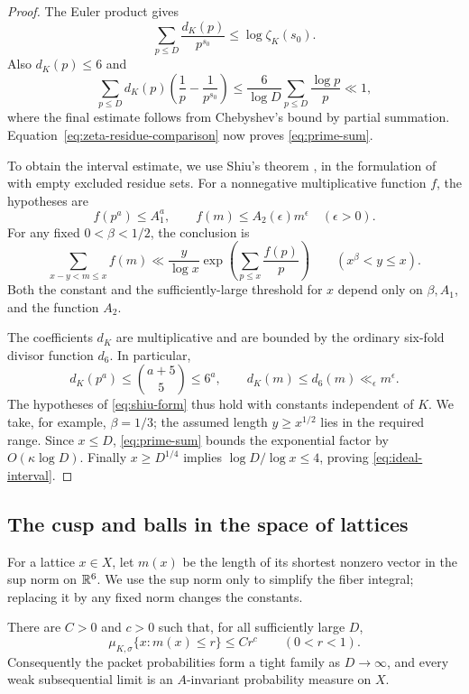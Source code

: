 \begin{proof}
The Euler product gives
\[
 \sum_{p\le D}\frac{d_K(p)}{p^{s_0}}
      \le\log\zeta_K(s_0).
\]
Also $d_K(p)\le6$ and
\[
 \sum_{p\le D}d_K(p)\left(\frac1p-\frac1{p^{s_0}}\right)
 \le\frac6{\log D}\sum_{p\le D}\frac{\log p}{p}\ll1,
\]
where the final estimate follows from Chebyshev's bound by partial
summation.  Equation~\eqref{eq:zeta-residue-comparison} now proves
\eqref{eq:prime-sum}.

To obtain the interval estimate, we use Shiu's theorem
\cite{Shiu1980}, in the formulation of
\cite[Theorem~1.1]{Pollack2020} with empty excluded residue sets.
For a nonnegative multiplicative function $f$, the hypotheses are
\[
 f(p^a)\le A_1^a,
 \qquad
 f(m)\le A_2(\epsilon)m^\epsilon
       \quad(\epsilon>0).
\]
For any fixed $0<\beta<1/2$, the conclusion is
\begin{equation}
 \sum_{x-y<m\le x}f(m)
 \ll\frac y{\log x}
     \exp\left(\sum_{p\le x}\frac{f(p)}p\right)
 \qquad(x^\beta<y\le x).                         \label{eq:shiu-form}
\end{equation}
Both the constant and the sufficiently-large threshold for $x$
depend only on $\beta,A_1$, and the function $A_2$.

The coefficients $d_K$ are multiplicative and are bounded by the
ordinary six-fold divisor function $d_6$.  In particular,
\[
 d_K(p^a)\le\binom{a+5}{5}\le6^a,
 \qquad d_K(m)\le d_6(m)\ll_\epsilon m^\epsilon.
\]
The hypotheses of \eqref{eq:shiu-form} thus hold with constants
independent of $K$.  We take, for example, $\beta=1/3$; the assumed
length $y\ge x^{1/2}$ lies in the required range.  Since $x\le D$,
\eqref{eq:prime-sum} bounds the exponential factor by
$O(\kappa\log D)$.  Finally $x\ge D^{1/4}$ implies
$\log D/\log x\le4$, proving \eqref{eq:ideal-interval}.
\end{proof}

\subsection{The cusp and balls in the space of lattices}

For a lattice $x\in X$, let $m(x)$ be the length of its shortest
nonzero vector in the sup norm on $\mathbb R^6$.  We use the sup norm only
to simplify the fiber integral; replacing it by any fixed norm
changes the constants.

\begin{proposition}\label{prop:cusp}
There are $C>0$ and $c>0$ such that, for all sufficiently large $D$,
\[
 \mu_{K,\sigma}\{x:m(x)\le r\}\le Cr^c
       \qquad(0<r<1).
\]
Consequently the packet probabilities form a tight family as
$D\to\infty$, and every weak subsequential limit is an
$A$-invariant probability measure on $X$.
\end{proposition}

